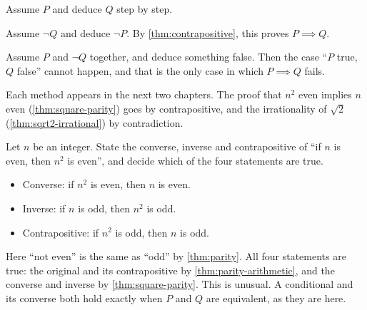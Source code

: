 \begin{description}[font=\normalfont\scshape]
  \item[Direct.] Assume $P$ and deduce $Q$ step by step.
  \item[Contrapositive.] Assume $\lnot Q$ and deduce $\lnot P$. By
    \cref{thm:contrapositive}, this proves $P \implies Q$.
  \item[Contradiction.] Assume $P$ and $\lnot Q$ together, and deduce
    something false. Then the case ``$P$ true, $Q$ false'' cannot happen,
    and that is the only case in which $P \implies Q$ fails.
\end{description}

Each method appears in the next two chapters. The proof that $n^2$ even
implies $n$ even (\cref{thm:square-parity}) goes by contrapositive, and the
irrationality of $\sqrt2$ (\cref{thm:sqrt2-irrational}) by contradiction.

\begin{exercise}\label{ex:converse-square}
  Let $n$ be an integer. State the converse, inverse and contrapositive of
  ``if $n$ is even, then $n^2$ is even'', and decide which of the four
  statements are true.
\end{exercise}

\begin{solution}
  \begin{itemize}
    \item Converse: if $n^2$ is even, then $n$ is even.
    \item Inverse: if $n$ is odd, then $n^2$ is odd.
    \item Contrapositive: if $n^2$ is odd, then $n$ is odd.
  \end{itemize}
  Here ``not even'' is the same as ``odd'' by \cref{thm:parity}. All four
  statements are true: the original and its contrapositive by
  \cref{thm:parity-arithmetic}, and the converse and inverse by
  \cref{thm:square-parity}. This is unusual. A conditional and its converse
  both hold exactly when $P$ and $Q$ are equivalent, as they are here.
\end{solution}
